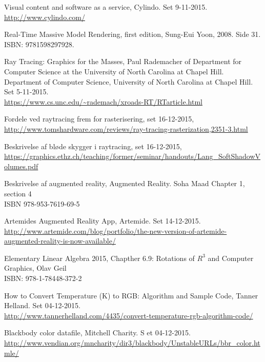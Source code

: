 \begin{thebibliography}{99}
  Visual content and software as a service,
  Cylindo.
  Set 9-11-2015.\\
  \url{http://www.cylindo.com/}
  
  Real-Time Massive Model Rendering, first edition, 
  Sung-Eui Yoon, 2008. Side 31. \\
  ISBN: 9781598297928.

  Ray Tracing: Graphics for the Masses, 
  Paul Rademacher of Department for Computer Science at the University of North Carolina at Chapel Hill.
  Department of Computer Science, University of North Carolina at Chapel Hill.
  Set 5-11-2015.\\
  \url{https://www.cs.unc.edu/~rademach/xroads-RT/RTarticle.html}

  Fordele ved raytracing frem for rasterisering, set 16-12-2015,\\
  \url{http://www.tomshardware.com/reviews/ray-tracing-rasterization,2351-3.html}

  Beskrivelse af bløde skygger i raytracing, set 16-12-2015,\\
  \url{https://graphics.ethz.ch/teaching/former/seminar/handouts/Lang_SoftShadowVolumes.pdf}
  
  Beskrivelse af augmented reality,
  Augmented Reality.
  Soha Maad
  Chapter 1, section 4\\
  ISBN 978-953-7619-69-5

  Artemides Augmented Reality App, 
  Artemide.
  Set 14-12-2015.\\
  \url{http://www.artemide.com/blog/portfolio/the-new-version-of-artemide-augmented-reality-is-now-available/}

  Elementary Linear Algebra 2015, Chapther 6.9: Rotations of $R^{3}$ and Computer Graphics, Olav Geil\\
  ISBN: 978-1-78448-372-2


  How to Convert Temperature (K) to RGB: Algorithm and   Sample Code,
  Tanner Helland.
  Set 04-12-2015.\\
  \url{http://www.tannerhelland.com/4435/convert-temperature-rgb-algorithm-code/}
  
  Blackbody color datafile, 
  Mitchell Charity. S
  et 04-12-2015.\\
  \url{http://www.vendian.org/mncharity/dir3/blackbody/UnstableURLs/bbr_color.htmle/}
  

\end{thebibliography}
